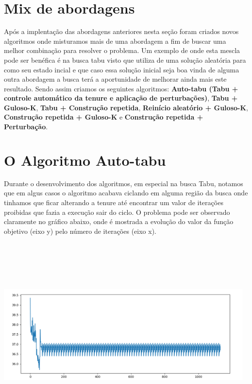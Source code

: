 \documentclass[a4paper,11pt]{article}
\begin{document}
\section{ Mix de abordagens }
Ap\'os a implenta\c c\~ao das abordagens anteriores nesta se\c c\~ao foram criados novos algoritmos onde misturamos mais de uma abordagem a fim de buscar uma melhor combina\c c\~ao para resolver o problema. Um exemplo de onde esta mescla pode ser ben\'efica \'e na busca tabu visto que utiliza de uma solu\c c\~ao aleat\'oria para como seu estado incial e que caso essa solu\c c\~ao inicial seja boa vinda de alguma outra abordagem a busca ter\'a a aportunidade de melhorar ainda mais este resultado. Sendo assim criamos os seguintes algoritmos: \textbf{Auto-tabu (Tabu + controle autom\'atico da \text tenure e aplica\c c\~ao de perturba\c c\~oes)}, \textbf{Tabu + Guloso-K}, \textbf{Tabu + Constru\c c\~ao repetida}, \textbf{Rein\'icio aleat\'orio + Guloso-K}, \textbf{Constru\c c\~ao repetida + Guloso-K} e \textbf{Constru\c c\~ao repetida + Perturba\c c\~ao}. 

\section{ O Algoritmo Auto-tabu}
Durante o desenvolvimento dos algoritmos, em especial na busca Tabu, notamos que em algus casos o algoritmo acabava ciclando em alguma regi\~ao da busca onde tinhamos que ficar alterando a tenure at\'e encontrar um valor de itera\c c\~oes proibidas que fazia a execu\c c\~ao sair do ciclo. O problema pode ser observado claramente no gr\'afico abaixo, onde \'e mostrada a evolu\c c\~ao do valor da fun\c c\~ao objetivo (eixo y) pelo n\'umero de itera\c c\~oes (eixo x).

\includegraphics[width=13cm, height=10cm]{graph1.png}
\end{document}
